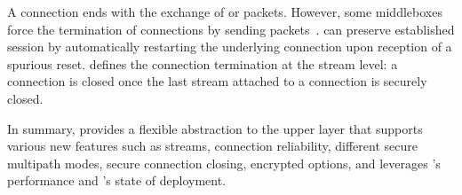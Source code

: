 A \tcp connection ends with the exchange of \fin or \rst packets. However, some
middleboxes force the termination of \tcp connections by sending \rst
packets~\cite{rfc3360,weaver2009detecting}. \tcpls can preserve established
session by automatically restarting the underlying \tcp connection upon
reception of a spurious reset. \tcpls defines the connection termination at the
stream level: a \tcp connection is closed once the last stream attached to a
\tcp connection is securely closed.

In summary, \tcpls provides a flexible abstraction to the
upper layer that supports various new features such as streams, connection
reliability, different secure multipath modes, secure connection closing,
encrypted \tcp options, and leverages \tcp's performance and \tls's state of
deployment.
